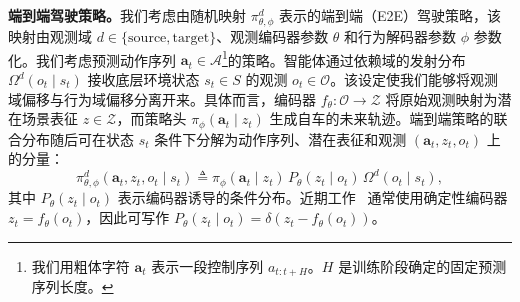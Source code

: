 \documentclass{article}
\begin{document}
\noindent \textbf{端到端驾驶策略。}我们考虑由随机映射 $\pi^{d}_{\theta,\phi}$ 表示的端到端（E2E）驾驶策略，该映射由观测域 $d\in\{\mathrm{source},\mathrm{target}\}$、观测编码器参数 $\theta$ 和行为解码器参数 $\phi$ 参数化。我们考虑预测动作序列 $\mathbf{a}_t\in\mathcal{A}$\footnote{我们用粗体字符 $\mathbf{a}_t$ 表示一段控制序列 $a_{t:t+H}$。$H$ 是训练阶段确定的固定预测序列长度。}的策略。智能体通过依赖域的发射分布 $\Omega^d(o_t\mid s_t)$ 接收底层环境状态 $s_t\in S$ 的观测 $o_t\in \mathcal{O}$。该设定使我们能够将观测域偏移与行为域偏移分离开来。具体而言，编码器 $f_\theta: \mathcal{O} \to \mathcal{Z}$ 将原始观测映射为潜在场景表征 $z \in \mathcal{Z}$，而策略头 $\pi_\phi(\mathbf{a}_t \mid z_t)$ 生成自车的未来轨迹。端到端策略的联合分布随后可在状态 $s_t$ 条件下分解为动作序列、潜在表征和观测 $(\mathbf{a}_t, z_t, o_t)$ 上的分量：
\begin{equation}
\label{eq:policy_state_latent_factor}
    \pi^{d}_{\theta,\phi}(\mathbf{a}_t,z_t,o_t \mid s_t) \triangleq \pi_{\phi}(\mathbf{a}_t\mid z_t)\,P_\theta(z_t\mid o_t)\,\Omega^d(o_t\mid s_t),
\end{equation}
其中 $P_\theta(z_t\mid o_t)$ 表示编码器诱导的条件分布。近期工作~\cite{diffusiondrive, diffusiondrivev2, RAP} 通常使用确定性编码器 $z_t=f_\theta(o_t)$，因此可写作 $P_\theta(z_t\mid o_t)=\delta(z_t-f_\theta(o_t))$。

\end{document}
